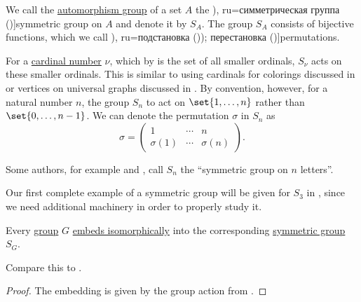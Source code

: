\begin{definition}\label{def:symmetric_group}
  We call the \hyperref[def:automorphism_group]{automorphism group} of a set \( A \) the \term[bg=симетрична група (\cite[376]{Обрешков1962ВисшаАлгебра}), ru=симметрическая группа (\cite[154]{Винберг2014Алгебра})]{symmetric group} on \( A \) and denote it by \( S_A \). The group \( S_A \) consists of bijective functions, which we call \term[bg=субституция (\cite[80]{ГеновМиховскиМоллов1991Алгебра}), ru=подстановка (\cite[154]{Винберг2014Алгебра})); перестановка (\cite[sec. 4.2]{Тыртышников2007ЛинейнаяАлгебра})]{permutations}.

  For a \hyperref[def:cardinal]{cardinal number} \( \nu \), which by  is the set of all smaller ordinals, \( S_\nu \) acts on these smaller ordinals. This is similar to using cardinals for colorings discussed in  or vertices on universal graphs discussed in . By convention, however, for a natural number \( n \), the group \( S_n \) to act on \( \set{ 1, \ldots, n } \) rather than \( \set{ 0, \ldots, n - 1 } \). We can denote the permutation \( \sigma \) in \( S_n \) as
  \begin{equation*}
    \sigma
    =
    \begin{pmatrix}
      1         & \cdots & n \\
      \sigma(1) & \cdots & \sigma(n)
    \end{pmatrix}.
  \end{equation*}
\end{definition}
\begin{comments}
  \item Some authors, for example  and , call \( S_n \) the \enquote{symmetric group on \( n \) letters}.

  \item Our first complete example of a symmetric group will be given for \( S_3 \) in , since we need additional machinery in order to properly study it.
\end{comments}

\begin{theorem}\label{thm:cayleys_theorem}
  Every \hyperref[def:group]{group} \( G \) \hyperref[rem:embeds_isomorphically]{embeds isomorphically} into the corresponding \hyperref[def:symmetric_group]{symmetric group} \( S_G \).
\end{theorem}
\begin{comments}
  \item Compare this to .
\end{comments}
\begin{proof}
  The embedding is given by the group action from .
\end{proof}

